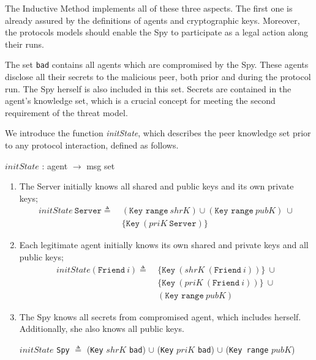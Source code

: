 The Inductive Method implements all of these three aspects. The first one is already assured by the definitions of agents and cryptographic keys. Moreover, the protocols models should enable the Spy to participate as a legal action along their runs.

The set \texttt{bad} contains all agents which are compromised by the Spy. These agents disclose all their secrets to the malicious peer, both prior and during the protocol run. The Spy herself is also included in this set. Secrets are contained in the agent's knowledge set, which is a crucial concept for meeting the second requirement of the threat model.

We introduce the function \textit{initState}, which describes the peer knowledge set prior to any protocol interaction, defined as follows.

\begin{center}
  {\ttfamily $initState$ : agent $\longrightarrow$ msg set}
\end{center}

\begin{enumerate}
  \item The Server initially knows all shared and public keys and its own private keys;
  \begin{equation*}
    \begin{split}
      initState\ \texttt{Server} \triangleq\
      & (\texttt{Key range}\ shrK) \cup (\texttt{Key range}\ pubK)\ \cup \\
      & \{\texttt{Key}\ (priK\ \texttt{Server})\}
    \end{split}
  \end{equation*}
  \item Each legitimate agent initially knows its own shared and private keys and all public keys;
  \begin{equation*}
    \begin{split}
      initState (\texttt{Friend}\ \textit{i}) \triangleq\
      & \{ \texttt{Key}\ (shrK\ (\texttt{Friend}\ i))\}\ \cup \\
      & \{ \texttt{Key}\ (priK\ (\texttt{Friend}\ i))\}\ \cup \\
      & (\texttt{Key range}\ pubK)
    \end{split}
  \end{equation*}
  \item The Spy knows all secrets from compromised agent, which includes herself. Additionally, she also knows all public keys.
  \begin{center}
    $initState$ \texttt{Spy} $\triangleq$ (\texttt{Key} $shrK$ \texttt{bad}) $\cup$ (\texttt{Key} $priK$ \texttt{bad}) $\cup$ (\texttt{Key range} $pubK$)
  \end{center}
\end{enumerate}

